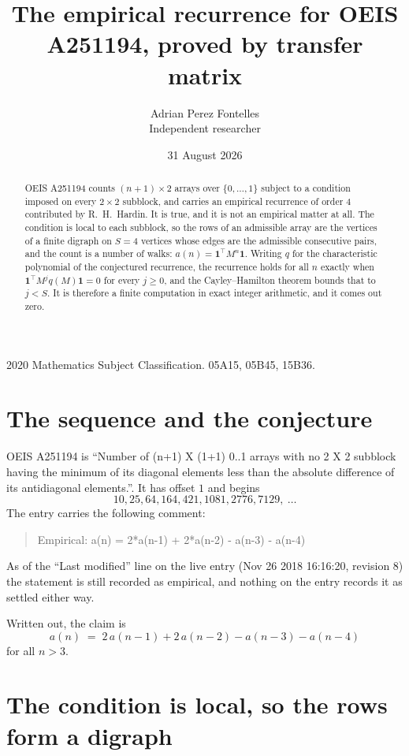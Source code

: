 \documentclass[11pt,a4paper]{article}
\title{The empirical recurrence for OEIS A251194, proved by transfer matrix}
\author{Adrian Perez Fontelles\\ \small Independent researcher}
\date{31 August 2026}
\theoremstyle{plain}
\theoremstyle{definition}
\begin{document}
\maketitle

\begin{abstract}
OEIS A251194 counts $(n+1)\times2$ arrays over $\{0,\dots,1\}$ subject to a condition imposed on
every $2\times2$ subblock, and carries an empirical recurrence of order $4$ contributed
by R.~H.~Hardin. It is true, and it is not an empirical matter at all. The condition is local
to each subblock, so the rows of an admissible array are the vertices of a finite digraph
on $S=4$ vertices whose edges are the admissible consecutive pairs, and the count is a
number of walks: $a(n)=\mathbf{1}^{\!\top}M^{n}\mathbf{1}$. Writing $q$
for the characteristic polynomial of the conjectured recurrence, the recurrence holds for all
$n$ exactly when $\mathbf{1}^{\!\top}M^{j}q(M)\mathbf{1}=0$ for every $j\ge0$, and the
Cayley--Hamilton theorem bounds that to $j<S$. It is therefore a finite computation in exact
integer arithmetic, and it comes out zero.
\end{abstract}

\noindent\small 2020 Mathematics Subject Classification. 05A15, 05B45, 15B36.\normalsize

\section{The sequence and the conjecture}

OEIS A251194 is ``Number of (n+1) X (1+1) 0..1 arrays with no 2 X 2 subblock having the minimum of its diagonal elements less than the absolute difference of its antidiagonal elements.''. It has offset $1$ and begins
\[
10, 25, 64, 164, 421, 1081, 2776, 7129,\ \dots
\]
The entry carries the following comment:
\begin{quote}\small
Empirical: a(n) = 2*a(n-1) + 2*a(n-2) - a(n-3) - a(n-4)
\end{quote}
As of the ``Last modified'' line on the live entry (Nov 26 2018 16:16:20, revision 8) the statement is
still recorded as empirical, and nothing on the entry records it as settled either way.

Written out, the claim is
\begin{equation}\label{eq:conj}
a(n)\;=\;2\,a(n-1) + 2\,a(n-2) - a(n-3) - a(n-4)
\end{equation}
for all $n>3$.

\section{The condition is local, so the rows form a digraph}
\end{document}
